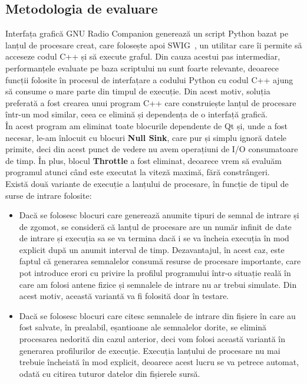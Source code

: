 \subsection{Metodologia de evaluare}
\label{sec:met-eval-perf}
Interfața grafică GNU Radio Companion generează un script Python bazat pe lanțul
de procesare creat, care folosește apoi SWIG~\cite{swig}, un utilitar care
îi permite să acceseze codul C++ și să execute graful. Din cauza acestui pas
intermediar, performanțele evaluate pe baza scriptului nu sunt foarte relevante,
deoarece funcții folosite în procesul de interfațare a codului Python cu codul
C++ ajung să consume o mare parte din timpul de execuție. Din acest motiv,
soluția preferată a fost crearea unui program C++ care construiește lanțul de
procesare într-un mod similar, ceea ce elimină și dependența de o interfață
grafică. \\

În acest program am eliminat toate blocurile dependente de Qt și, unde a fost
necesar, le-am înlocuit cu blocuri \textbf{Null Sink}, care pur și simplu ignoră
datele primite, deci din acest punct de vedere nu avem operațiuni de I/O
consumatoare de timp. În plus, blocul \textbf{Throttle} a fost eliminat,
deoarece vrem să evaluăm programul atunci când este executat la viteză maximă,
fără constrângeri. \\

Există două variante de execuție a lanțului de procesare, în funcție de tipul de
surse de intrare folosite:
\begin{itemize}
  \item Dacă se folosesc blocuri care generează anumite tipuri de semnal de
  intrare și de zgomot, se consideră că lanțul de procesare are un număr infinit
  de date de intrare și execuția sa se va termina  dacă i se va
  încheia execuția în mod explicit după un anumit interval de timp.
  Dezavantajul, în acest caz, este faptul că generarea semnalelor consumă
  resurse de procesare importante, care pot introduce erori cu privire la profilul
  programului într-o situație reală în care am folosi antene fizice și semnalele de
  intrare nu ar trebui simulate. Din acest motiv, această variantă va fi
  folosită doar în testare.

  \item Dacă se folosesc blocuri care citesc semnalele de intrare din fișiere în
  care au fost salvate, în prealabil, eșantioane ale semnalelor dorite, se
  elimină procesarea nedorită din cazul anterior, deci vom folosi această
  variantă în generarea profilurilor de execuție. Execuția lanțului de procesare
  nu mai trebuie încheiată în mod explicit, deoarece acest lucru se va petrece
  automat, odată cu citirea tuturor datelor din fișierele sursă.
\end{itemize}

